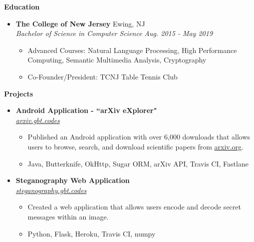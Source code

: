 \documentclass[letterpaper,10pt]{article}
\newcommand{\resitem}[1]{\item #1 \vspace{-2pt}}
\newcommand{\resheading}[1]{{\large \colorbox{mygrey}{\begin{minipage}{\textwidth}{\textbf{#1 \vphantom{p\^{E}}}}\end{minipage}}}}
\newcommand{\ressubheading}[4]{%
  \item\textbf{#1} \hfill #2\null\\
  \textit{#3} \hfill \textit{#4}%
  \vspace{-5pt}
}%
\begin{document}
\resheading{Education}
\begin{itemize}

\ressubheading{The College of New Jersey}{Ewing, NJ}{Bachelor of Science in Computer Science}{Aug. 2015 - May 2019}
	\begin{itemize}
		\resitem{Advanced Courses: Natural Language Processing, High Performance Computing, Semantic Multimedia Analysis, Cryptography}
		\resitem{Co-Founder/President: TCNJ Table Tennis Club}
	\end{itemize}
\end{itemize}

\resheading{Projects}
\begin{itemize}

\ressubheading{Android Application - ``arXiv eXplorer"}{}{\href{http://arxiv.gbt.codes}{arxiv.gbt.codes}}{}
	\begin{itemize}
		\resitem{Published an Android application with over 6,000 downloads that allows users to browse, search, and download scientific papers from \href{http://arxiv.org}{arxiv.org}.}
		\resitem{Java, Butterknife, OkHttp, Sugar ORM, arXiv API, Travis CI, Fastlane}
	\end{itemize}
	

\ressubheading{Steganography Web Application}{}{\href{http://steganography.gbt.codes}{steganography.gbt.codes}}{}
	\begin{itemize}
		\resitem{Created a web application that allows users encode and decode secret messages within an image.}
		\resitem{Python, Flask, Heroku, Travis CI, numpy}
	\end{itemize}




\end{itemize}
\end{document}

